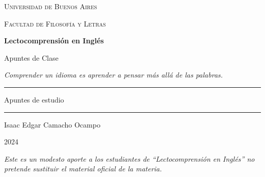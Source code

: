 \documentclass[12pt,oneside]{book}
\newcommand{\universidad}{Universidad de Buenos Aires}
\newcommand{\facultad}{Facultad de Filosofía y Letras}
\newcommand{\materia}{Lectocomprensión en Inglés}
\newcommand{\titulo}{Apuntes de Clase}
\newcommand{\autor}{Isaac Edgar Camacho Ocampo}
\newcommand{\anio}{2024}
\newcommand{\reflexionmotivacional}{Comprender un idioma es aprender a pensar más allá de las palabras.}
\begin{document}
\begin{titlepage}

\thispagestyle{empty}

\begin{center}

\vspace*{1cm}

{\large \textsc{\universidad}}

\vspace{0.2cm}

{\large \textsc{\facultad}}

\vspace{3cm}

{\Huge \textbf{\materia}}

\vspace{1cm}

{\LARGE \titulo}

\vspace{0.8cm}

\textit{\reflexionmotivacional}

\vspace{1.2cm}

\rule{0.70\textwidth}{0.5pt}

\vspace{0.5cm}

{\large Apuntes de estudio}

\vspace{0.5cm}

\rule{0.70\textwidth}{0.5pt}

\vfill

{\large \autor}

\vspace{0.3cm}

{\large \anio}

\end{center}

\vfill

\begin{flushleft}
\textit{Este es un modesto aporte a los estudiantes de ``\materia'' no pretende sustituir el material oficial de la materia.}
\end{flushleft}

\end{titlepage}

\tableofcontents
\clearpage
\end{document}
